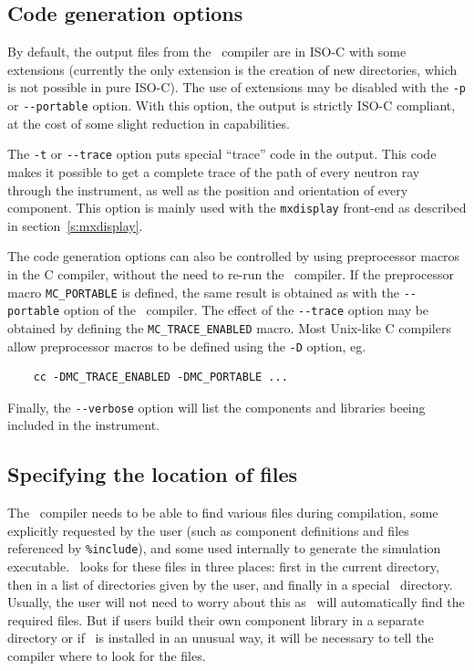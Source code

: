 \subsection{Code generation options}

By default, the output files from the \MCX\ compiler are in ISO-C with
some extensions (currently the only extension is the creation of new
directories, which is not possible in pure ISO-C). The use of
extensions may be disabled with the \verb+-p+ or \verb+--portable+
option. With this option, the output is strictly ISO-C compliant, at
the cost of some slight reduction in capabilities.

The \verb+-t+ or \verb+--trace+ option puts special ``trace'' code in
the output. This code makes it possible to get a complete trace of the
path of every neutron ray through the instrument, as well as the position
and orientation of every component. This option is mainly used with the
\verb+mxdisplay+ front-end as described in section~\ref{s:mxdisplay}.

The code generation options can also be controlled by using preprocessor
macros in the C compiler, without the need to re-run the \MCX\
compiler. If the preprocessor macro \verb+MC_PORTABLE+ is defined, the
same result is obtained as with the \verb+--portable+ option of the
\MCX\ compiler. The effect of the \verb+--trace+ option may be obtained
by defining the \verb+MC_TRACE_ENABLED+ macro. Most Unix-like C
compilers allow preprocessor macros to be defined using the \verb+-D+
option, eg.
\begin{verbatim}
    cc -DMC_TRACE_ENABLED -DMC_PORTABLE ...
\end{verbatim}
Finally, the \verb+--verbose+ option will list the components and libraries beeing
included in the instrument.

\subsection{Specifying the location of files}
\label{s:files}

The \MCX\ compiler needs to be able to find various files during
compilation, some explicitly requested by the user (such as component
definitions and files referenced by \verb+%include+), 
and some used internally to generate the simulation executable. \MCX\ looks for these
files in three places: first in the current directory, then in a list of
directories given by the user, and finally in a special \MCX\
directory. Usually, the user will not need to worry about this as \MCX\
will automatically find the required files. But if users build their own
component library in a separate directory or if \MCX\ is installed in an
unusual way, it will be necessary to tell the compiler where to look
for the files.

